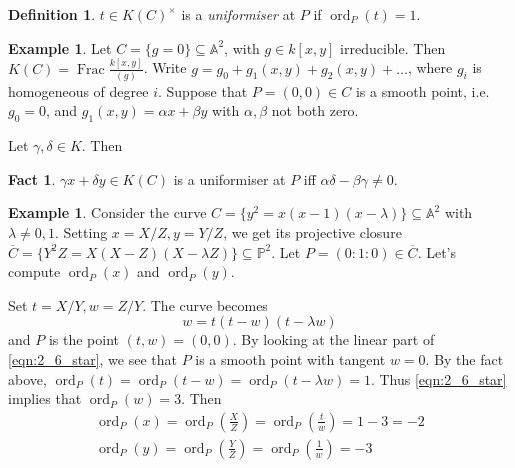 \documentclass[11pt]{article}
\theoremstyle{definition}
\newtheorem*{definition*}{Definition}
\newtheorem{example}[definition]{Example}
\newtheorem*{fact}{Fact}
\theoremstyle{plain}
\theoremstyle{remark}
\DeclareMathOperator{\ord}{ord}
\DeclareMathOperator{\Frac}{Frac}
\newcommand{\PP}{\mathbb{P}}
\newcommand{\bA}{\mathbb{A}}
\begin{document}
\begin{definition*}
    $t \in K(C)^\times$ is a \emph{uniformiser} at $P$ if $\ord_P(t) = 1$.
\end{definition*}

\begin{example}\label{eg:2_5}
    Let $C = \{g = 0\} \subseteq \bA^2$, with $g \in k[x,y]$ irreducible. Then $K(C) = \Frac \frac{k[x,y]}{(g)}$. Write $g = g_0 + g_1(x,y) + g_2(x,y) + \ldots$, where $g_i$ is homogeneous of degree $i$. Suppose that $P = (0, 0) \in C$ is a smooth point, i.e. $g_0 = 0$, and $g_1(x,y) = \alpha x + \beta y$ with $\alpha, \beta$ not both zero.
    \begin{figure}[htpb]
    \centering
    \end{figure}

    Let $\gamma, \delta \in K$. Then

    \begin{fact}
        $\gamma x + \delta y \in K(C)$ is a uniformiser at $P$ iff $\alpha \delta - \beta \gamma \neq 0$.
    \end{fact}
\end{example}

\begin{example}\label{eg:2_6}
    Consider the curve $C = \{y^2 = x(x-1)(x-\lambda)\} \subseteq \bA^2$ with $\lambda \neq 0, 1$. Setting $x=X/Z, y=Y/Z$, we get its projective closure $\overline{C} = \{Y^2 Z = X (X-Z) (X-\lambda Z)\} \subseteq \PP^2$. Let $P = (0 : 1 : 0) \in \overline{C}$. Let's compute $\ord_P(x)$ and $\ord_P(y)$.

    Set $t=X/Y, w=Z/Y$. The curve becomes
    \begin{equation}\label{eqn:2_6_star}
        w = t(t-w)(t-\lambda w)
    \end{equation}
    and $P$ is the point $(t,w)=(0,0)$. By looking at the linear part of \eqref{eqn:2_6_star}, we see that $P$ is a smooth point with tangent $w = 0$. By the fact above, $\ord_P(t)=\ord_P(t-w)=\ord_P(t-\lambda w)=1$. Thus \eqref{eqn:2_6_star} implies that $\ord_P(w) = 3$. Then
    \begin{gather*}
        \ord_P(x) = \ord_P\left(\frac{X}{Z}\right) = \ord_P\left(\frac{t}{w}\right) = 1-3 = -2\\
        \ord_P(y) = \ord_P\left(\frac{Y}{Z}\right) = \ord_P\left(\frac{1}{w}\right) = -3
    \end{gather*}
\end{example}
\end{document}
